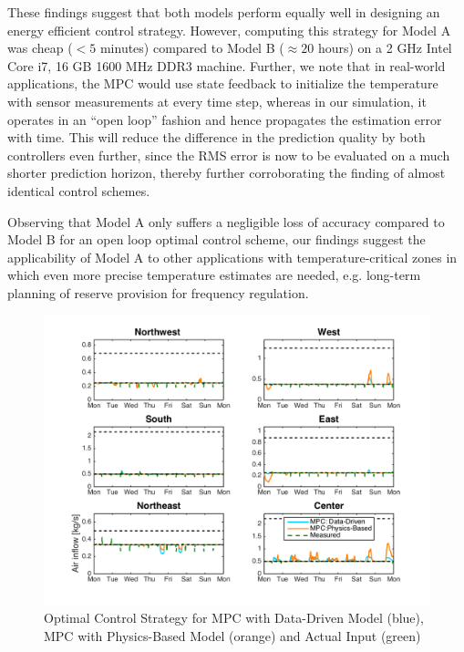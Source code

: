 These findings suggest that both models perform equally well in designing an energy efficient control strategy. However, computing this strategy for Model A was cheap ($<5$ minutes) compared to Model B ($\approx 20$ hours) on a 2 GHz Intel Core i7, 16 GB 1600 MHz DDR3 machine. Further, we note that in real-world applications, the MPC would use state feedback to initialize the temperature with sensor measurements at every time step, whereas in our simulation, it operates in an ``open loop'' fashion and hence propagates the estimation error with time. This will reduce the difference in the prediction quality by both controllers even further, since the RMS error is now to be evaluated on a much shorter prediction horizon, thereby further corroborating the finding of almost identical control schemes.

Observing that Model A only suffers a negligible loss of accuracy compared to Model B for an open loop optimal control scheme, our findings suggest the applicability of Model A to other applications with temperature-critical zones in which even more precise temperature estimates are needed, e.g. long-term planning of reserve provision for frequency regulation.


\begin{figure}[t]
\centering
\vspace*{-0.4cm}
\includegraphics[scale=0.46]{chapters/building_model/figures/Comparison_Flow.png}
\vspace*{-0.5cm}
\caption{Optimal Control Strategy for MPC with Data-Driven Model (blue), MPC with Physics-Based Model (orange) and Actual Input (green)}
\vspace*{-0.2cm}
\label{fig:MPC_comparison_flow}
\end{figure}

